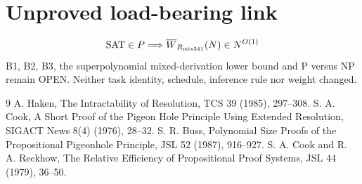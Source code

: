\documentclass{article}
\begin{document}
\section*{Unproved load-bearing link}
\[ \mathrm{SAT}\in P\Longrightarrow\overline W_{R_{\rm mix341}}(N)\in N^{O(1)} \]
B1, B2, B3, the superpolynomial mixed-derivation lower bound and P versus NP remain OPEN. Neither task identity, schedule, inference rule nor weight changed.
\begin{thebibliography}{9}
 A. Haken, The Intractability of Resolution, TCS 39 (1985), 297--308.
 S. A. Cook, A Short Proof of the Pigeon Hole Principle Using Extended Resolution, SIGACT News 8(4) (1976), 28--32.
 S. R. Buss, Polynomial Size Proofs of the Propositional Pigeonhole Principle, JSL 52 (1987), 916--927.
 S. A. Cook and R. A. Reckhow, The Relative Efficiency of Propositional Proof Systems, JSL 44 (1979), 36--50.
\end{thebibliography}
\end{document}
